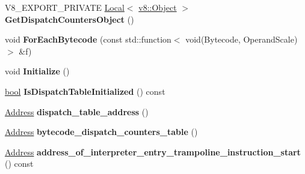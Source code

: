 \begin{DoxyCompactItemize}
\item 
\mbox{\label{classv8_1_1internal_1_1interpreter_1_1Interpreter_aa9051f15da75ce1c80fbe37fb0fd9a73}} 
V8\+\_\+\+E\+X\+P\+O\+R\+T\+\_\+\+P\+R\+I\+V\+A\+TE \mbox{\hyperlink{classv8_1_1Local}{Local}}$<$ \mbox{\hyperlink{classv8_1_1Object}{v8\+::\+Object}} $>$ {\bfseries Get\+Dispatch\+Counters\+Object} ()
\item 
\mbox{\label{classv8_1_1internal_1_1interpreter_1_1Interpreter_a16f8e32a5397cc32cd9c387d4a0dbc54}} 
void {\bfseries For\+Each\+Bytecode} (const std\+::function$<$ void(Bytecode, Operand\+Scale)$>$ \&f)
\item 
\mbox{\label{classv8_1_1internal_1_1interpreter_1_1Interpreter_a38ec4f6bc9bbac84c6834847dcbafecb}} 
void {\bfseries Initialize} ()
\item 
\mbox{\label{classv8_1_1internal_1_1interpreter_1_1Interpreter_af26d63eeddc302eeb00183eb91d0f073}} 
\mbox{\hyperlink{classbool}{bool}} {\bfseries Is\+Dispatch\+Table\+Initialized} () const
\item 
\mbox{\label{classv8_1_1internal_1_1interpreter_1_1Interpreter_ad208aa6e4cd6c4440dd43eee243ccd02}} 
\mbox{\hyperlink{classuintptr__t}{Address}} {\bfseries dispatch\+\_\+table\+\_\+address} ()
\item 
\mbox{\label{classv8_1_1internal_1_1interpreter_1_1Interpreter_ac242337609472144f10ece1eb04fa348}} 
\mbox{\hyperlink{classuintptr__t}{Address}} {\bfseries bytecode\+\_\+dispatch\+\_\+counters\+\_\+table} ()
\item 
\mbox{\label{classv8_1_1internal_1_1interpreter_1_1Interpreter_a73f9cbcb62a52628ff11a2464c4e6e33}} 
\mbox{\hyperlink{classuintptr__t}{Address}} {\bfseries address\+\_\+of\+\_\+interpreter\+\_\+entry\+\_\+trampoline\+\_\+instruction\+\_\+start} () const
\end{DoxyCompactItemize}
